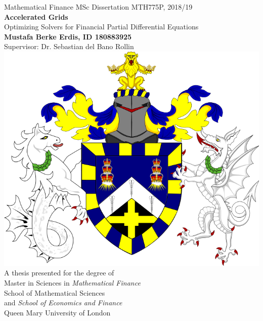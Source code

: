 \documentclass[12pt, oneside]{book}
\theoremstyle{plain}
\theoremstyle{definition}
\begin{document}
\begin{titlepage}
\begin{center}
        \vspace{-2cm}
Mathematical Finance MSc Dissertation MTH775P, 2018/19 
		\\
        \Huge
        \textbf{Accelerated Grids}
        \\        
        \vspace{0.4cm}
        \LARGE
        Optimizing Solvers for Financial Partial Differential Equations
        \\        
        \vspace{0.4cm}        
        \textbf{Mustafa Berke Erdis, ID 180883925}%
        \\
        \large Supervisor: Dr. Sebastian del Bano Rollin
        \\
        \vspace{0.9cm}
        \includegraphics[scale=0.23]{QMCrest.png}
        \\
        \vspace{0.9cm}        
        \LARGE 
        A thesis presented for the degree of\\
        Master in Sciences in \emph{Mathematical Finance}\\
        \vspace{0.7cm}        
        \Large
        School of Mathematical Sciences\\ 
        and \emph{School of Economics and Finance}\\
        Queen Mary University of London \\
    \end{center}
\end{titlepage}
\end{document}
